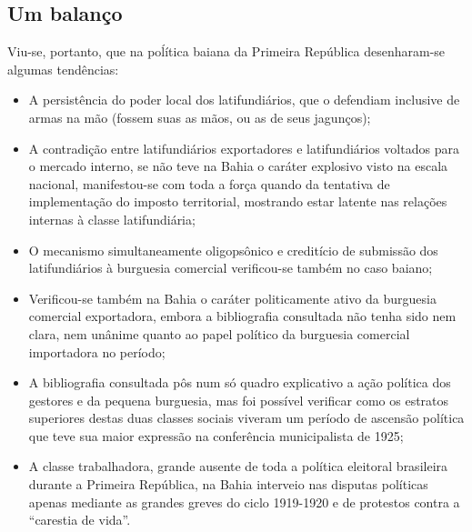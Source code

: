 \subsection{Um balanço}

Viu-se, portanto, que na poĺítica baiana da Primeira República desenharam-se algumas tendências:

\begin{itemize}
\item A persistência do poder local dos latifundiários, que o defendiam inclusive de armas na mão (fossem suas as mãos, ou as de seus jagunços);
\item A contradição entre latifundiários exportadores e latifundiários voltados para o mercado interno, se não teve na Bahia o caráter explosivo visto na escala nacional, manifestou-se com toda a força quando da tentativa de implementação do imposto territorial, mostrando estar latente nas relações internas à classe latifundiária;
\item O mecanismo simultaneamente oligopsônico e creditício de submissão dos latifundiários à burguesia comercial verificou-se também no caso baiano;
\item Verificou-se também na Bahia o caráter politicamente ativo da burguesia comercial exportadora, embora a bibliografia consultada não tenha sido nem clara, nem unânime quanto ao papel político da burguesia comercial importadora no período;
\item A bibliografia consultada pôs num só quadro explicativo a ação política dos gestores e da pequena burguesia, mas foi possível verificar como os estratos superiores destas duas classes sociais viveram um período de ascensão política que teve sua maior expressão na conferência municipalista de 1925;
\item A classe trabalhadora, grande ausente de toda a política eleitoral brasileira durante a Primeira República, na Bahia interveio nas disputas políticas apenas mediante as grandes greves do ciclo 1919-1920 e de protestos contra a ``carestia de vida''.
\end{itemize}